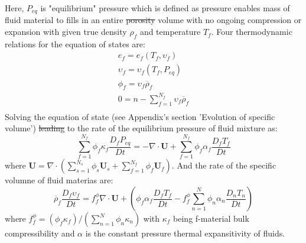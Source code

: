 \documentclass[preprint,12pt]{elsarticle}
\providecommand{\DIFadd}[1]{{\protect\color{blue}\uwave{#1}}} %
\providecommand{\DIFdel}[1]{{\protect\color{red}\sout{#1}}}                      %
\providecommand{\DIFaddbegin}{} %
\providecommand{\DIFaddend}{} %
\providecommand{\DIFdelbegin}{} %
\providecommand{\DIFdelend}{} %
\newcommand{\DIFscaledelfig}{0.5}
\newlength{\DIFdelgraphicswidth} %
\newlength{\DIFdelgraphicsheight} %
\newcommand{\DIFaddincludegraphics}[2][]{{\color{blue}\fbox{\DIFOincludegraphics[#1]{#2}}}} %
\newcommand{\DIFdelincludegraphics}[2][]{%
\sbox{\DIFdelgraphicsbox}{\DIFOincludegraphics[#1]{#2}}%
\settoboxwidth{\DIFdelgraphicswidth}{\DIFdelgraphicsbox} %
\settoboxtotalheight{\DIFdelgraphicsheight}{\DIFdelgraphicsbox} %
\scalebox{\DIFscaledelfig}{%
\parbox[b]{\DIFdelgraphicswidth}{\usebox{\DIFdelgraphicsbox}\\[-\baselineskip] \rule{\DIFdelgraphicswidth}{0em}}\llap{\resizebox{\DIFdelgraphicswidth}{\DIFdelgraphicsheight}{%
\setlength{\unitlength}{\DIFdelgraphicswidth}%
\begin{picture}(1,1)%
\thicklines\linethickness{2pt} %
{\color[rgb]{1,0,0}\put(0,0){\framebox(1,1){}}}%
{\color[rgb]{1,0,0}\put(0,0){\line( 1,1){1}}}%
{\color[rgb]{1,0,0}\put(0,1){\line(1,-1){1}}}%
\end{picture}%
}\hspace*{3pt}}} %
} %
\DeclareRobustCommand{\DIFaddbegin}{\DIFOaddbegin \let\includegraphics\DIFaddincludegraphics} %
\DeclareRobustCommand{\DIFaddend}{\DIFOaddend \let\includegraphics\DIFOincludegraphics} %
\DeclareRobustCommand{\DIFdelbegin}{\DIFOdelbegin \let\includegraphics\DIFdelincludegraphics} %
\DeclareRobustCommand{\DIFdelend}{\DIFOaddend \let\includegraphics\DIFOincludegraphics} %
\begin{document}
Here, $P_{eq}$ is "equilibrium" pressure which is defined as pressure enables mass of fluid material to fills in an entire \DIFdelbegin \DIFdel{porosity }\DIFdelend \DIFaddbegin \DIFadd{pore }\DIFaddend volume with no ongoing compression or expansion with given true density $\rho_f$ and temperature $T_f$.  Four thermodynamic relations for the equation of states are:
%
%
\begin{equation}
\begin{gathered}
  e_f =  e_f (T_f, \upsilon_f)\\
 \upsilon_f =  \upsilon_f (T_f, P_{eq})\\
  \phi_f = \upsilon_f \overline{\rho}_f\\
  0 = n - \sum_{f=1}^{N_f} \upsilon_f \overline{\rho}_f\\
\end{gathered}
\end{equation}
%
%
Solving the equation of state (see Appendix's section 'Evolution of specific volume') \DIFdelbegin \DIFdel{leading }\DIFdelend to the rate of the equilibrium pressure of fluid mixture as:
%
%
\begin{equation}
\sum_{f=1}^{N_f} \phi_f \kappa_f \frac{D_f P_{eq}}{Dt} = - \nabla \cdot \pmb{U} + \sum_{f=1}^{N_f} \phi_f \alpha_f \frac{D_f T_f}{Dt}
\end{equation}
%
%
where $\pmb{U} = \nabla \cdot (\sum_{s=1}^{N_s} \phi_s \pmb{U}_s + \sum_{f=1}^{N_f}  \phi_f \pmb{U}_f)$.
And the rate of the specific volumne of fluid materias are:
%
%
\begin{equation}
\label{specific volume}
\overline{\rho}_f \frac{D_f \upsilon_f }{Dt} = f_f^{\phi} \nabla \cdot \pmb{U} + (\phi_f \alpha_f \frac{D_f T_f}{Dt} - f_f^{\phi} \sum_{n=1}^{N} \phi_n \alpha_n \frac{D_n T_n}{Dt})
\end{equation}
where $ f_f^{\phi} = (\phi_f  \kappa_f ) / (\sum_{n=1}^{N} \phi_n \kappa_n)$ with  $\kappa_f$ being f-material bulk compressibility and $\alpha$ is the constant pressure thermal expansitivity of fluids.
%
%
\end{document}
